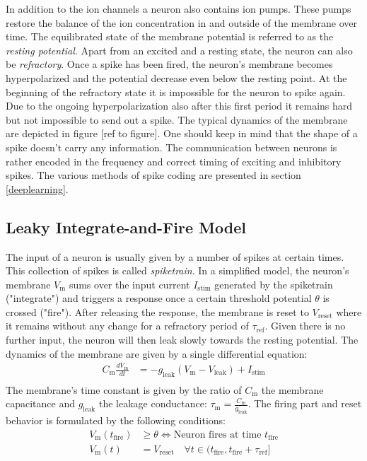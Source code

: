 In addition to the ion channels a neuron also contains ion pumps. These pumps restore the balance of the ion concentration in and outside of the membrane over time. The equilibrated state of the membrane potential is referred to as the \textit{resting potential}. Apart from an excited and a resting state, the neuron can also be \textit{refractory}. Once a spike has been fired, the neuron's membrane becomes hyperpolarized and the potential decrease even below the resting point. At the beginning of the refractory state it is impossible for the neuron to spike again. Due to the ongoing hyperpolarization also after this first period it remains hard but not impossible to send out a spike. The typical dynamics of the membrane are depicted in figure [ref to figure]. One should keep in mind that the shape of a spike doesn't carry any information.  The communication between neurons is rather encoded in the frequency and correct timing of exciting and inhibitory spikes. The various methods of spike coding are presented in section \ref{deeplearning}. 

\subsection{Leaky Integrate-and-Fire Model}

The input of a neuron is usually given by a number of spikes at certain times. This collection of spikes is called \textit{spiketrain}. In a simplified model, the neuron's membrane $V_{\text{m}}$ sums over the input current $I_{\text{stim}}$ generated by the spiketrain ("integrate") and triggers a response once a certain threshold potential $\mathcal{\theta}$ is crossed ("fire"). After releasing the response, the membrane is reset to $V_{\text{reset}}$ where it remains without any change for a refractory period of $\tau_{\text{ref}}$. Given there is no further input, the neuron will then leak slowly towards the resting potential. The dynamics of the membrane are given by a single differential equation:
\begin{align}
C_{\text{m}} \frac{dV_{\text{m}}}{dt} &= -g_{\text{leak}} (V_{\text{m}} - V_{\text{leak}}) + I_{\text{stim}} \\
\end{align}
The membrane's time constant is given by the ratio of $C_{\text{m}}$ the membrane capacitance and $g_{\text{leak}}$ the leakage conductance: $\tau_{\text{m}} = \frac{C_{\text{m}}}{g_{\text{leak}}}$. The firing part and reset behavior is formulated by the following conditions:
\begin{align}
V_{\text{m}}(t_{\text{fire}}) &\ge \theta \Leftrightarrow \text{Neuron fires at time } t_{\text{fire}} \\
V_{\text{m}}(t) &= V_{\text{reset}} \quad \forall t \in (t_{\text{fire}}, t_{\text{fire}} + \tau_{\text{ref}}] 
\end{align}


